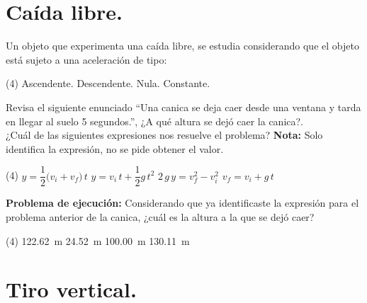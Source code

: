 \documentclass[12pt, letter]{exam}
\begin{document}
\begin{questions}
    \section{Caída libre.}
    
    \question Un objeto que experimenta una caída libre, se estudia considerando que el objeto está sujeto a una aceleración de tipo:
    \begin{tasks}(4)
        \task Ascendente.
        \task Descendente.
        \task Nula.
        \task Constante.
    \end{tasks}
    \question Revisa el siguiente enunciado \enquote{Una canica se deja caer desde una ventana y tarda en llegar al suelo \num{5} segundos.}, ¿A qué altura se dejó caer la canica?. 
    \\
    ¿Cuál de las siguientes expresiones nos resuelve el problema? \textbf{Nota: } Solo identifica la expresión, no se pide obtener el valor.
    \begin{tasks}(4)
        \task $y = \dfrac{1}{2} \big( v_{i} + v_{f} \big) \, t$
        \task $y = v_{i} \, t + \dfrac{1}{2} g \, t^{2}$
        \task $2 \, g \, y = v_{f}^{2} - v_{i}^{2}$
        \task $v_{f} = v_{i} + g \, t$
    \end{tasks}
    \question \label{Problema_02} \textbf{Problema de ejecución:} Considerando que ya identificaste la expresión para el problema anterior de la canica, ¿cuál es la altura a la que se dejó caer?
    \begin{tasks}(4)
        \task \SI{122.62}{\meter}
        \task \SI{24.52}{\meter}
        \task \SI{100.00}{\meter}
        \task \SI{130.11}{\meter}
    \end{tasks}

    \newpage

    \section{Tiro vertical.}


\end{questions}
\end{document}
